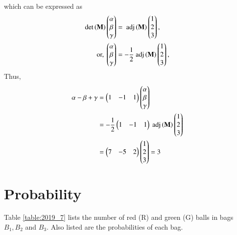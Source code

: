 \documentclass[journal,12pt,twocolumn]{IEEEtran}
\renewcommand\thesection{\arabic{section}}
\begin{document}
\begin{enumerate}[label=\thesection.\arabic*
,ref=\thesection.\theenumi]
\begin{align}
\end{align}
%
which can be expressed as
\begin{align}
 \det\left(\mathbf{M}\right)\begin{pmatrix}\alpha \\ \beta \\ \gamma\end{pmatrix}  &= \text{ adj}\left(\mathbf{M}\right)\begin{pmatrix}1 \\ 2 \\ 3\end{pmatrix}, 
\\
\text{or, } \begin{pmatrix}\alpha \\ \beta \\ \gamma\end{pmatrix} &= -\frac{1}{2}\text{ adj}\left(\mathbf{M}\right)\begin{pmatrix}1 \\ 2 \\ 3\end{pmatrix}, 
\end{align}
Thus, 
\begin{align}
\alpha - \beta + \gamma &= \begin{pmatrix}1 & -1& 1\end{pmatrix} \begin{pmatrix}\alpha \\ \beta \\ \gamma\end{pmatrix} 
\\
&=-\frac{1}{2}\begin{pmatrix}1 & -1& 1\end{pmatrix}\text{ adj}\left(\mathbf{M}\right)\begin{pmatrix}1 \\ 2 \\ 3\end{pmatrix}
\\
&=\begin{pmatrix}7 & -5& 2\end{pmatrix}\begin{pmatrix}1 \\ 2 \\ 3\end{pmatrix}
=3
\end{align}
\end{enumerate}
\section{Probability}
Table \ref{table:2019_7} lists the number of red (R) and green (G) balls in bags $B_1, B_2$ and $B_3$. Also listed are the probabilities of each bag.
\begin{table}[!h]
\centering
%

\caption{}
\label{table:2019_7}
\end{table}
\end{document}
